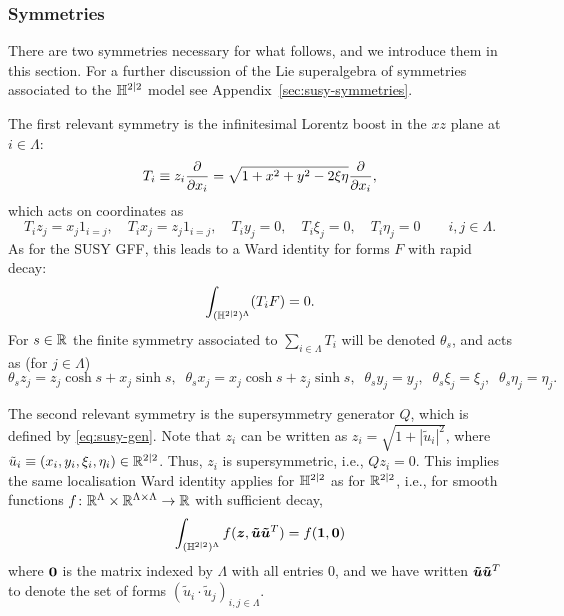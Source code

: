 \documentclass[11pt,a4paper]{article}
\begin{document}
\subsubsection{Symmetries}
There are two symmetries necessary for what follows, and we
introduce them in this section. For a further discussion of the
Lie superalgebra of symmetries associated to the $\mathbb{H}^{2|2}$ model see
Appendix~\ref{sec:susy-symmetries}.

The first relevant symmetry is the infinitesimal Lorentz boost
in the $xz$ plane at $i\in\Lambda$:
\begin{equation}
  \label{eq:H22-boost}
  T_i \equiv z_i \frac{\partial }{\partial x_i} = \sqrt{1+x^2+y^2 - 2\xi\eta}\frac{\partial }{\partial x_i},
\end{equation}
which acts on coordinates as
\begin{equation}
T_iz_j = x_j1_{i=j},\quad T_ix_j = z_j1_{i=j},\quad  T_iy_j = 0,\quad
T_i\xi_j = 0,\quad T_i\eta_j = 0 \qquad i,j\in\Lambda.
\end{equation}
As for the SUSY GFF, this leads to a Ward identity
for forms $F$ with rapid decay:
\begin{equation}
  \label{eq:IBP-SUSY-H22}
  \int_{(\mathbb{H}^{2|2})^{\Lambda}} (T_{i}F) = 0  .
\end{equation}
For $s\in\mathbb{R}$ the finite symmetry associated to $\sum_{i\in\Lambda} T_i$ will be denoted
$\theta_s$, and acts as (for $j\in\Lambda$)
\begin{equation}
\label{eq:h22-boost}
\theta_s z_j = z_j\cosh{s} + x_j\sinh{s},\;\; \theta_sx_j =
x_j\cosh{s} + z_j\sinh{s},\;\;  \theta_sy_j = y_j,\;\; \theta_s\xi_j
= \xi_j,\;\; \theta_s\eta_j = \eta_j. 
\end{equation}

The second relevant symmetry is the supersymmetry generator $Q$, which
is defined by \eqref{eq:susy-gen}.  Note that $z_i$ can be written as
$z_i = \sqrt{1+ |\tilde u_i|^2}$, where
$\tilde u_i \equiv (x_i,y_i,\xi_i,\eta_i) \in \mathbb{R}^{2|2}$.  Thus,
$z_{i}$ is supersymmetric, i.e., $Qz_{i}=0$. This implies the same
localisation Ward identity applies for $\mathbb{H}^{2|2}$ as for $\mathbb{R}^{2|2}$,
i.e., for smooth functions
$f\colon \mathbb{R}^{\Lambda}\times \mathbb{R}^{\Lambda\times\Lambda}\to \mathbb{R}$ with
sufficient decay,
\begin{equation}
  \label{eq:h22loc}
  \int_{(\mathbb{H}^{2|2})^{\Lambda}} f(\boldsymbol{z},\boldsymbol{\tilde u}\boldsymbol{\tilde u}^T) = f(\boldsymbol{1},\boldsymbol{0})
\end{equation}
where $\boldsymbol{0}$ is the matrix indexed by $\Lambda$ with all entries $0$, and we
have written $\boldsymbol{\tilde u}\boldsymbol{\tilde u}^{T}$ to denote the set of
forms $(\tilde u_{i}\cdot \tilde u_{j})_{i,j\in\Lambda}$.
\end{document}
